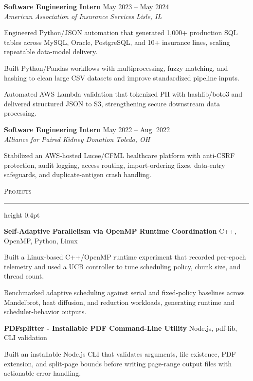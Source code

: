 \documentclass[letterpaper,11pt]{article}
\newcommand{\resumesection}[1]{%
  \par\vspace{2pt}%
  {\large\scshape #1}\par\vspace{2pt}%
  \hrule height 0.4pt\vspace{2pt}%
}
\newcommand{\resumeSubheading}[4]{
  \textbf{#1} \hfill #2\\
  \textit{#3} \hfill \textit{#4}
}
\newcommand{\projectHeading}[2]{
  \textbf{#1} \hfill #2
}
\begin{document}
\resumeSubheading
{Software Engineering Intern}{May 2023 -- May 2024}
{American Association of Insurance Services}{Lisle, IL}
\begin{tightitemize}
  \item Engineered Python/JSON automation that generated 1,000+ production SQL tables across MySQL, Oracle, PostgreSQL, and 10+ insurance lines, scaling repeatable data-model delivery.
  \item Built Python/Pandas workflows with multiprocessing, fuzzy matching, and hashing to clean large CSV datasets and improve standardized pipeline inputs.
  \item Automated AWS Lambda validation that tokenized PII with hashlib/boto3 and delivered structured JSON to S3, strengthening secure downstream data processing.
\end{tightitemize}

\resumeSubheading
{Software Engineering Intern}{May 2022 -- Aug. 2022}
{Alliance for Paired Kidney Donation}{Toledo, OH}
\begin{tightitemize}
  \item Stabilized an AWS-hosted Lucee/CFML healthcare platform with anti-CSRF protection, audit logging, access routing, import-ordering fixes, data-entry safeguards, and duplicate-antigen crash handling.
\end{tightitemize}

\resumesection{Projects}
\projectHeading{Self-Adaptive Parallelism via OpenMP Runtime Coordination}{C++, OpenMP, Python, Linux}
\begin{tightitemize}
  \item Built a Linux-based C++/OpenMP runtime experiment that recorded per-epoch telemetry and used a UCB controller to tune scheduling policy, chunk size, and thread count.
  \item Benchmarked adaptive scheduling against serial and fixed-policy baselines across Mandelbrot, heat diffusion, and reduction workloads, generating runtime and scheduler-behavior outputs.
\end{tightitemize}

\projectHeading{PDFsplitter - Installable PDF Command-Line Utility}{Node.js, pdf-lib, CLI validation}
\begin{tightitemize}
  \item Built an installable Node.js CLI that validates arguments, file existence, PDF extension, and split-page bounds before writing page-range output files with actionable error handling.
\end{tightitemize}
\end{document}
